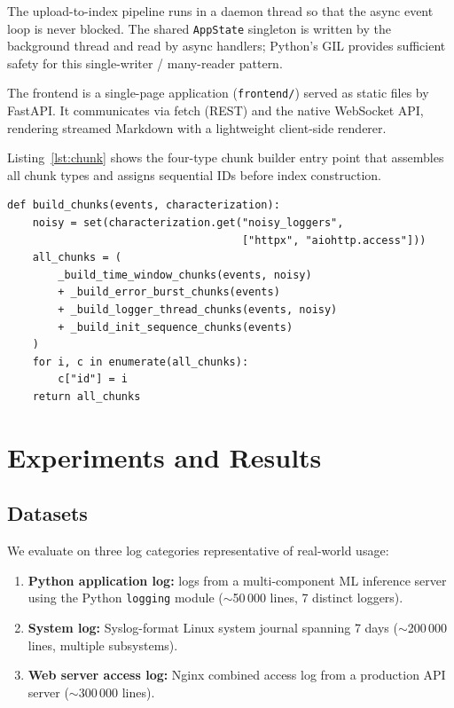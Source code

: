 \documentclass[runningheads]{llncs}
\begin{document}
The upload-to-index pipeline runs in a daemon thread so that the async event
loop is never blocked. The shared \texttt{AppState} singleton is written by
the background thread and read by async handlers; Python's GIL provides
sufficient safety for this single-writer / many-reader pattern.

The frontend is a single-page application (\texttt{frontend/}) served as
static files by FastAPI. It communicates via fetch (REST) and the native
WebSocket API, rendering streamed Markdown with a lightweight client-side
renderer.

Listing~\ref{lst:chunk} shows the four-type chunk builder entry point that
assembles all chunk types and assigns sequential IDs before index construction.

\begin{lstlisting}[caption={Chunk builder entry point (\texttt{backend/rag.py}).},
                   label={lst:chunk}]
def build_chunks(events, characterization):
    noisy = set(characterization.get("noisy_loggers",
                                     ["httpx", "aiohttp.access"]))
    all_chunks = (
        _build_time_window_chunks(events, noisy)
        + _build_error_burst_chunks(events)
        + _build_logger_thread_chunks(events, noisy)
        + _build_init_sequence_chunks(events)
    )
    for i, c in enumerate(all_chunks):
        c["id"] = i
    return all_chunks
\end{lstlisting}

\section{Experiments and Results}
\label{sec:results}

\subsection{Datasets}

We evaluate on three log categories representative of real-world usage:

\begin{enumerate}
  \item \textbf{Python application log:} logs from a multi-component ML
        inference server using the Python \texttt{logging} module ($\sim$50\,000
        lines, 7 distinct loggers).
  \item \textbf{System log:} Syslog-format Linux system journal spanning 7
        days ($\sim$200\,000 lines, multiple subsystems).
  \item \textbf{Web server access log:} Nginx combined access log from a
        production API server ($\sim$300\,000 lines).
\end{enumerate}
\end{document}
